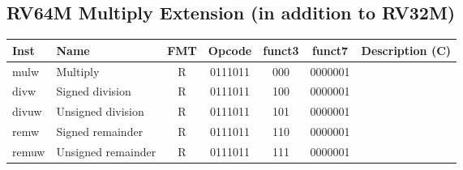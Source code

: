 \subsection*{RV64M Multiply Extension (in addition to RV32M)}
\begin{center}
    
\begin{tabular}
{T | l | c | c | c | c | T} \hline
\rm Inst & Name                    & FMT & \rm Opcode & \rm funct3 & \rm funct7 & \rm Description (C)          \\ \hline
mulw     & Multiply   & R   & 0111011    & 000    & 0000001   &                \\
divw     & Signed division   & R   & 0111011    & 100    & 0000001   &             \\
divuw    & Unsigned division   & R   & 0111011    & 101    & 0000001   &                \\
remw     & Signed remainder   & R   & 0111011    & 110    & 0000001   &               \\
remuw    & Unsigned remainder   & R   & 0111011    & 111    & 0000001   &        \\

\end{tabular}
\end{center}

